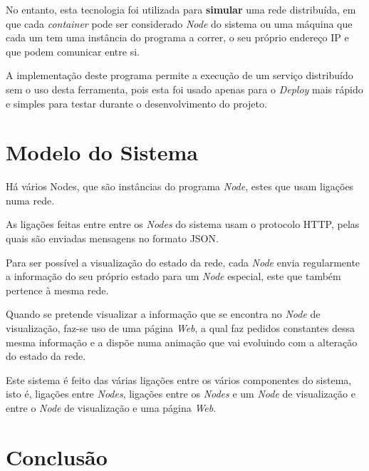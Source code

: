 No entanto, esta tecnologia foi utilizada para \textbf{simular} uma rede distribuída,
em que cada \emph{container} pode ser considerado \emph{Node} do sistema ou uma máquina que cada um tem uma instância do programa a correr,
o seu próprio endereço \acs{IP} e que podem comunicar entre si.

A implementação deste programa permite a execução de um serviço distribuído sem o uso desta ferramenta, pois esta foi
usado apenas para o \emph{Deploy} mais rápido e simples para testar durante o desenvolvimento do projeto.

\section{Modelo do Sistema}

Há vários Nodes, que são instâncias do programa \emph{Node}, estes que usam ligações numa rede.

As ligações feitas entre entre os \emph{Nodes} do sistema usam o protocolo \acs*{HTTP}, pelas quais são
enviadas mensagens no formato \acs*{JSON}.

Para ser possível a visualização do estado da rede, cada \emph{Node} envia regularmente a informação do
seu próprio estado para um \emph{Node} especial, este que também pertence à mesma rede.

Quando se pretende visualizar a informação que se encontra no \emph{Node} de visualização, faz-se uso de
uma página \emph{Web}, a qual faz pedidos constantes dessa mesma informação e a dispõe numa animação que 
vai evoluindo com a alteração do estado da rede.

Este sistema é feito das várias ligações entre os vários componentes do sistema, isto é,
ligações entre \emph{Nodes}, ligações entre os \emph{Nodes} e um \emph{Node} de visualização 
e entre o \emph{Node} de visualização e uma página \emph{Web}.


\section{Conclusão}
\label{engenharia:sec:introducao}

